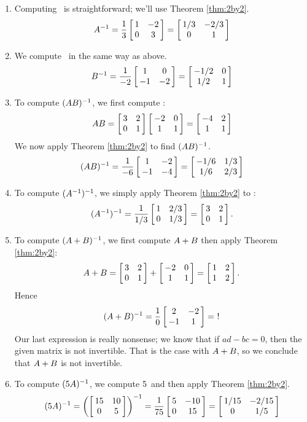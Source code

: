 {\begin{enumerate}
\item	Computing \ttai\ is straightforward; we'll use Theorem \ref{thm:2by2}. 
	$$\ttai = \frac{1}{3}\bmx{cc}1&-2\\0&3\emx = \bmx{cc} 1/3 & -2/3\\ 0 & 1\emx$$
	
\item	We compute \ttbi\ in the same way as above.
  $$\ttbi = \frac{1}{-2}\bmx{cc}1&0\\-1&-2\emx = \bmx{cc} -1/2 & 0 \\ 1/2 & 1\emx$$
  
\item	To compute $(\tta\ttb)^{-1}$, we first compute \tta\ttb:
	$$\tta\ttb = \bmx{cc}3&2\\0&1\emx\bmx{cc}-2 & 0\\1&1\emx = \bmx{cc} -4&2\\1&1\emx$$
	    We now apply Theorem \ref{thm:2by2} to find $(\tta\ttb)^{-1}$.
	$$(\tta\ttb)^{-1} = \frac{1}{-6}\bmx{cc}1&-2\\-1&-4\emx = \bmx{cc} -1/6 & 1/3\\1/6 & 2/3\emx$$
	
\item	To compute $(\ttai)^{-1}$, we simply apply Theorem \ref{thm:2by2} to \ttai:
  $$(\ttai)^{-1} = \frac{1}{1/3}\bmx{cc}1 & 2/3\\0 & 1/3\emx = \bmx{cc} 3 & 2\\0 & 1\emx.$$
  
\item	To compute $(\tta + \ttb)^{-1}$, we first compute $\tta+\ttb$ then apply Theorem \ref{thm:2by2}:
  $$\tta+\ttb = \bmx{cc}3&2\\0&1\emx+\bmx{cc}-2 & 0\\1&1\emx = \bmx{cc}1&2\\1&2\emx.$$
  Hence
  $$(\tta+\ttb)^{-1} = \frac{1}{0}\bmx{cc}2&-2\\-1&1\emx =\ !$$
  Our last expression is really nonsense; we know that if $ad-bc=0$, then the given matrix is not invertible. That is the case with $\tta+\ttb$, so we conclude that $\tta+\ttb$ is not invertible.
  
\item		To compute $(5\tta)^{-1}$, we compute 5\tta\ and then apply Theorem \ref{thm:2by2}.
	$$(5\tta)^{-1} = \left(\bmx{cc} 15 & 10\\0&5\emx\right)^{-1} = \frac{1}{75}\bmx{cc}5&-10\\0&15\emx = \bmx{cc} 1/15 & -2/15\\ 0 & 1/5\emx$$
  

\end{enumerate}}
